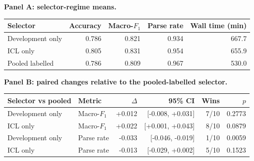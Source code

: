 \begin{minipage}{\linewidth}
\centering
\textbf{Panel A: selector-regime means.}\\[3pt]
\begin{tabular}{@{}lrrrr@{}}
\toprule
Selector & Accuracy & Macro-$F_1$ & Parse rate & Wall time (min) \\
\midrule
Development only & 0.786 & 0.821 & 0.934 & 667.7 \\
ICL only & 0.805 & 0.831 & 0.954 & 655.9 \\
Pooled labelled & 0.786 & 0.809 & 0.967 & 530.0 \\
\bottomrule
\end{tabular}
\par\medskip
\textbf{Panel B: paired changes relative to the pooled-labelled selector.}\\[3pt]
\begin{tabular}{@{}llrrrr@{}}
\toprule
Selector vs pooled & Metric & $\Delta$ & 95\% CI & Wins & $p$ \\
\midrule
Development only & Macro-$F_1$ & +0.012 & [-0.008, +0.031] & 7/10 & 0.2773 \\
ICL only & Macro-$F_1$ & +0.022 & [+0.001, +0.043] & 8/10 & 0.0879 \\
Development only & Parse rate & -0.033 & [-0.046, -0.019] & 1/10 & 0.0059 \\
ICL only & Parse rate & -0.013 & [-0.029, +0.002] & 5/10 & 0.1523 \\
\bottomrule
\end{tabular}
\end{minipage}